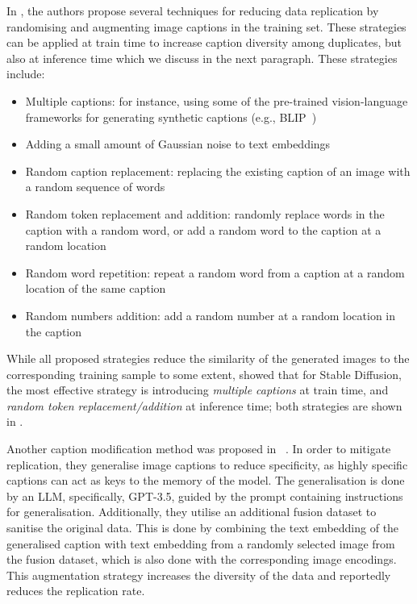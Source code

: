 \documentclass[conference,table]{IEEEtran}
\begin{document}
In \cite{somepalli_understanding_2023}, the authors propose several techniques for reducing data replication by randomising and augmenting image captions in the training set. 
These strategies can be applied at train time to increase caption diversity among duplicates, but also at inference time which we discuss in the next paragraph.
These strategies include: 
\begin{itemize}
    \item Multiple captions: for instance, using some of the pre-trained vision-language frameworks for generating synthetic captions (e.g., BLIP~\cite{li_blip_2022})
    \item Adding a small amount of Gaussian noise to text embeddings
    \item Random caption replacement: replacing the existing caption of an image with a random sequence of words
    \item Random token replacement and addition: randomly replace words in the caption with a random word, or add a random word to the caption at a random location
    \item Random word repetition: repeat a random word from a caption at a random location of the same caption
    \item Random numbers addition: add a random number at a random location in the caption
\end{itemize}
While all proposed strategies reduce the similarity of the generated images to the corresponding training sample to some extent, \cite{somepalli_understanding_2023} showed that for Stable Diffusion, the most effective strategy is introducing \textit{multiple captions} at train time, and \textit{random token replacement/addition} at inference time; both strategies are shown in .

Another caption modification method was proposed in ~\cite{li_mitigate_2024}. 
In order to mitigate replication, they generalise image captions to reduce specificity, as highly specific captions can act as keys to the memory of the model. 
The generalisation is done by an LLM, specifically, GPT-3.5, guided by the prompt containing instructions for generalisation. 
Additionally, they utilise an additional fusion dataset to sanitise the original data. 
This is done by combining the text embedding of the generalised caption with text embedding from a randomly selected image from the fusion dataset, which is also done with the corresponding image encodings. This augmentation strategy increases the diversity of the data and reportedly reduces the replication rate.
\end{document}
